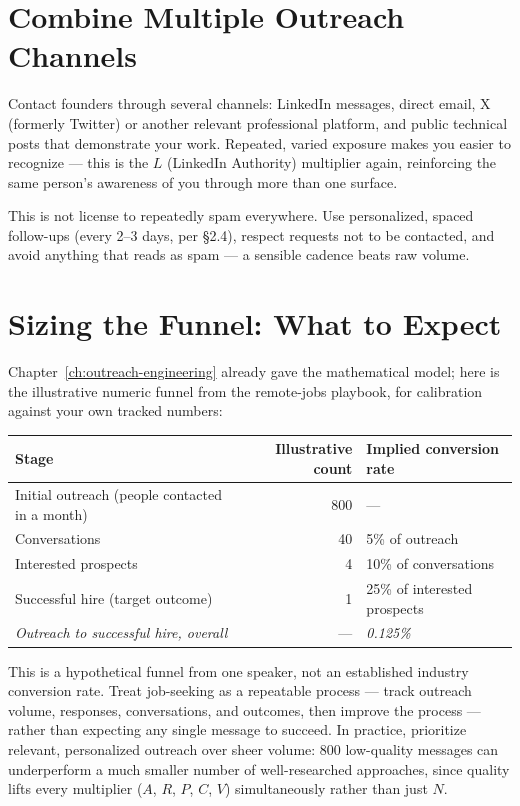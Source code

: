\section{Combine Multiple Outreach Channels}

Contact founders through several channels: LinkedIn messages, direct email, X (formerly Twitter) or another
relevant professional platform, and public technical posts that demonstrate your work. Repeated, varied exposure
makes you easier to recognize --- this is the $L$ (LinkedIn Authority) multiplier again, reinforcing the same
person's awareness of you through more than one surface.

\begin{caution}
This is not license to repeatedly spam everywhere. Use personalized, spaced follow-ups (every 2--3 days, per
\S2.4), respect requests not to be contacted, and avoid anything that reads as spam --- a sensible cadence beats
raw volume.
\end{caution}

\section{Sizing the Funnel: What to Expect}

Chapter~\ref{ch:outreach-engineering} already gave the mathematical model; here is the illustrative numeric funnel
from the remote-jobs playbook, for calibration against your own tracked numbers:

\begin{longtable}{p{} r p{}}
\toprule
\textbf{Stage} & \textbf{Illustrative count} & \textbf{Implied conversion rate} \\
\midrule
\endhead
Initial outreach (people contacted in a month) & 800 & --- \\
Conversations & 40 & 5\% of outreach \\
Interested prospects & 4 & 10\% of conversations \\
Successful hire (target outcome) & 1 & 25\% of interested prospects \\
\emph{Outreach to successful hire, overall} & --- & \emph{0.125\%} \\
\bottomrule
\end{longtable}

\begin{caution}
This is a hypothetical funnel from one speaker, not an established industry conversion rate. Treat job-seeking as
a repeatable process --- track outreach volume, responses, conversations, and outcomes, then improve the process
--- rather than expecting any single message to succeed. In practice, prioritize relevant, personalized outreach
over sheer volume: 800 low-quality messages can underperform a much smaller number of well-researched approaches,
since quality lifts every multiplier ($A$, $R$, $P$, $C$, $V$) simultaneously rather than just $N$.
\end{caution}


